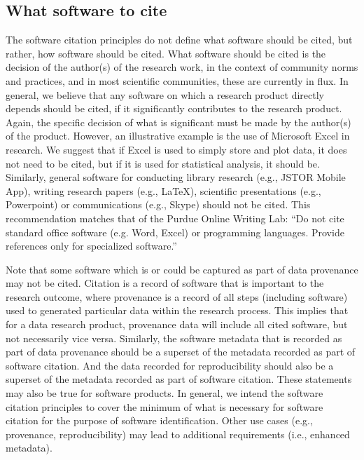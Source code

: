 \documentclass[11pt, oneside]{amsart}
\newcommand{\dmnote}[1]{ {\textcolor{purple} { ***DM: #1 }}} %
\newcommand{\ssnote}[1]{ {\textcolor{bondiblue} { ***SS: #1}}} %
\begin{document}
\subsection{What software to cite}

The software citation principles do not define what software should be cited, but rather, how software should be cited.
What software should be cited is the decision of the author(s) of the research work, in the context of community norms and practices, and in most scientific communities, these are currently in flux.
In general, we believe that any software on which a research product directly depends should be cited, if it significantly contributes to the research product.
Again, the specific decision of what is significant must be made by the author(s) of the product.
However, an illustrative example is the use of Microsoft Excel in research.
We suggest that if Excel is used to simply store and plot data, it does not need to be cited, but if it is used for statistical analysis, it should be.  Similarly, general software for conducting library research (e.g., JSTOR Mobile App), writing research papers (e.g., \LaTeX), scientific presentations (e.g., Powerpoint) or communications (e.g., Skype) should not be cited.
This recommendation matches that of the Purdue Online Writing Lab: ``Do not cite standard office software (e.g. Word, Excel) or programming languages.  Provide references only for specialized software.''~\cite{powl-citing-software}

Note that some software which is or could be captured as part of data provenance may not be cited.
Citation is a record of software that is important to the research outcome, where provenance is a record of all steps (including software) used to generated particular data within the research process.
This implies that for a data research product, provenance data will include all cited software, but not necessarily vice versa.
Similarly, the software metadata that is recorded as part of data provenance should be a superset of the metadata recorded as part of software citation.
And the data recorded for reproducibility should also be a superset of the metadata recorded as part of software citation.
These statements may also be true for software products.
In general, we intend the software citation principles to cover the minimum of what is necessary for software citation for the purpose of software identification.
Other use cases (e.g., provenance, reproducibility) may lead to additional requirements (i.e., enhanced metadata).
\end{document}
